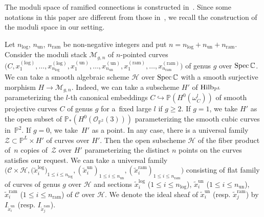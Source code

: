 \documentclass[pdftex]{sigma}
\numberwithin{equation}{section}
\newcommand\Spec{\mathop{\rm Spec}\nolimits}
\newcommand\Hilb{\mathop{\rm Hilb}\nolimits}
\begin{document}
The moduli space of ramified connections is constructed in~\cite{Inaba-2}.
Since some notations in this paper are different from those in~\cite{Inaba-2},
we recall the construction of the moduli space in our setting.

Let $n_{\mathrm{log}}$, $n_{\mathrm{un}}$, $n_{\mathrm{ram}}$ be non-negative integers
and put $n=n_{\mathrm{log}}+n_{\mathrm{un}}+n_{\mathrm{ram}}$.
Consider the moduli stack ${\mathcal M}_{g,n}$
of $n$-pointed curves
$\big( C,x^{(\mathrm{log})}_1,\dots,x^{(\mathrm{log})}_{n_{\mathrm{log}}},
x^{(\mathrm{un})}_1,\dots,x^{(\mathrm{un})}_{n_{\mathrm{un}}},
x^{(\mathrm{ram})}_1,\dots,x^{(\mathrm{ram})}_{n_{\mathrm{ram}}}\big)$
of genus $g$ over $\Spec \mathbb{C}$.
We can take a smooth algebraic scheme ${\mathcal H}$ over $\Spec\mathbb{C}$
with a smooth surjective morphism
$H\longrightarrow{\mathcal M}_{g,n}$.
Indeed, we can take a subscheme $H'$ of $\Hilb_{\mathbb{P}^L}$
parameterizing the $l$-th canonical embeddings
$C\hookrightarrow \mathbb{P}(H^0(\omega_C^l))$
of smooth projective curves $C$ of genus $g$ for a~fixed large $l$
if $g\geq 2$.
If $g=1$, we take $H'$ as the open subset of
$\mathbb{P}_*(H^0({\mathcal O}_{\mathbb{P}^2}(3)))$
parameterizing the smooth cubic curves in~$\mathbb{P}^2$.
If $g=0$, we take~$H'$ as a point.
In any case, there is a universal family ${\mathcal Z}\subset\mathbb{P}^L\times H'$
of curves over $H'$.
Then the open subscheme ${\mathcal H}$ of the fiber product of~$n$ copies of~${\mathcal Z}$
over $H'$ parameterizing the distinct $n$ points on the curves satisfies our request.
We can take a universal family
$\big(
{\mathcal C}\times{\mathcal H},
\big( \tilde{x}^{\mathrm{log}}_i \big)_{1\leq i\leq n_{\mathrm{log}}} ,
( \tilde{x}^{\mathrm{un}}_i )_{1\leq i\leq n_{\mathrm{un}}} ,
( \tilde{x}^{\mathrm{ram}}_i )_{1\leq i\leq n_{\mathrm{ram}}} \big)$
consisting of flat family of curves of genus $g$ over ${\mathcal H}$
and sections
$\tilde{x}^{\mathrm{log}}_i$ ($1\leq i\leq n_{\mathrm{log}}$),
$\tilde{x}^{\mathrm{un}}_i$ ($1\leq i\leq n_{\mathrm{un}}$),
$\tilde{x}^{\mathrm{ram}}_i$ ($1\leq i\leq n_{\mathrm{ram}}$)
of ${\mathcal C}$ over ${\mathcal H}$.
We denote the ideal sheaf of $\tilde{x}^{\mathrm{un}}_i$
(resp. $\tilde{x}^{\mathrm{ram}}_j$)
by $I_{\tilde{x}^{\mathrm{un}}_i}$ (resp. $I_{\tilde{x}^{\mathrm{ram}}_j}$).
\end{document}
